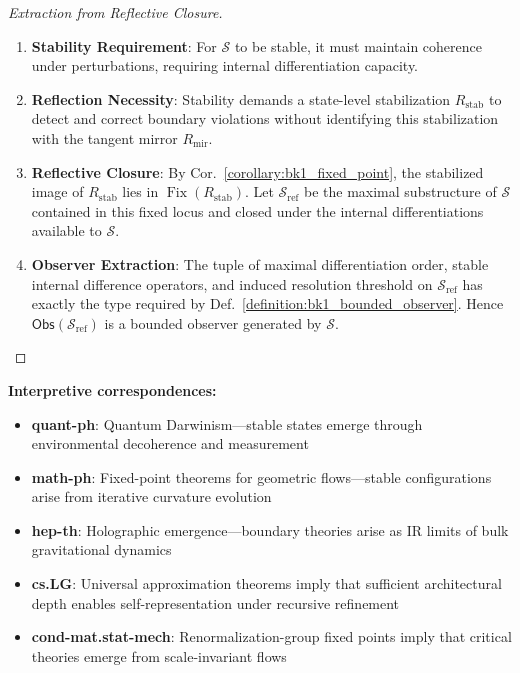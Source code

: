 \begin{scholium}
\begin{theorem}
\begin{proof}[Extraction from Reflective Closure]
\label{proof:bk1_constitutive_bootstrap_extraction}
\leavevmode
\begin{enumerate}
\item \textbf{Stability Requirement}: For $\mathcal{S}$ to be stable, it must maintain coherence under perturbations, requiring internal differentiation capacity.
\item \textbf{Reflection Necessity}: Stability demands a state-level stabilization \(R_{\mathrm{stab}}\) to detect and correct boundary violations without identifying this stabilization with the tangent mirror \(R_{\mathrm{mir}}\).
\item \textbf{Reflective Closure}: By Cor.~\ref{corollary:bk1_fixed_point}, the stabilized image of \(R_{\mathrm{stab}}\) lies in \(\operatorname{Fix}(R_{\mathrm{stab}})\). Let \(\mathcal{S}_{\mathrm{ref}}\) be the maximal substructure of \(\mathcal{S}\) contained in this fixed locus and closed under the internal differentiations available to \(\mathcal{S}\).
\item \textbf{Observer Extraction}: The tuple of maximal differentiation order, stable internal difference operators, and induced resolution threshold on \(\mathcal{S}_{\mathrm{ref}}\) has exactly the type required by Def.~\ref{definition:bk1_bounded_observer}. Hence \(\mathsf{Obs}(\mathcal{S}_{\mathrm{ref}})\) is a bounded observer generated by \(\mathcal{S}\).
\end{enumerate}
\end{proof}

\textbf{Interpretive correspondences:}
\begin{itemize}
\item \textbf{quant-ph}: Quantum Darwinism—stable states emerge through environmental decoherence and measurement
\item \textbf{math-ph}: Fixed-point theorems for geometric flows—stable configurations arise from iterative curvature evolution
\item \textbf{hep-th}: Holographic emergence—boundary theories arise as IR limits of bulk gravitational dynamics
\item \textbf{cs.LG}: Universal approximation theorems imply that sufficient
architectural depth enables self-representation under recursive refinement
\item \textbf{cond-mat.stat-mech}: Renormalization-group fixed points imply
that critical theories emerge from scale-invariant flows
\end{itemize}
\end{theorem}


\end{scholium}
